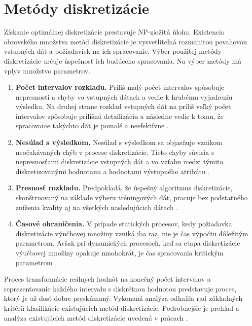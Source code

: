 
\section{Metódy diskretizácie}
Získanie optimálnej diskretizácie prestavuje NP-zložitú úlohu. Existencia obrovského množstva metód diskretizácie je vysvetliteľná rozmanitou povahovou vstupných dát a požiadaviek na ich spracovanie. Výber použitej metódy diskretizácie určuje úspešnosť ich budúceho spracovania. Na výber metódy má vplyv množstvo parametrov.  \cite{levashenkoProj, Chelbus1998}
\begin{enumerate}
	\item \textbf{Počet intervalov rozkladu.}  Príliš malý počet intervalov spôsobuje nepresnosti a chyby vo vstupných dátach a vedie k hrubému vyjadreniu výsledku. Na druhej strane rozklad vstupných dát na príliš veľký počet intervalov spôsobuje prílišnú detailizáciu a následne vedie k tomu, že spracovanie takýchto dát je pomalé a neefektívne  \cite{levashenkoProj, Catlett1991}. %
	\item \textbf{Nesúlad s výsledkom. }  Nesúlad s výsledkom sa objasňuje vznikom neočakávaných chýb v procese diskretizácie. Tieto chyby súvisia s nepresnosťami diskretizácie vstupných dát a vo vzťahu medzi týmito diskretizovanými hodnotami a hodnotami výstupného atribútu \cite{levashenkoProj}. 
	\item \textbf{Presnosť rozkladu.}  Predpokladá, že úspešný algoritmus diskretizácie, skonštruovaný na základe výberu tréningových dát, pracuje bez podstatného zníženia kvality aj na všetkých nasledujúcich dátach \cite{levashenkoProj}. 
	\item \textbf{Časové ohraničenia.}  V prípade statických procesov, kedy požiadavka diskretizácie výučbovej množiny vzniká iba raz, nie je čas výpočtu dôležitým parametrom. Avšak pri dynamických procesoch, keď sa etapa diskretizácie výučbovej množiny opakuje mnohokrát, je čas spracovania kritickým parametrom  \cite{levashenkoProj}.
\end{enumerate}

Proces transformácie reálnych hodnôt na konečný počet intervalov a reprezentovanie každého intervalu s diskrétnou hodnotou predstavuje proces, ktorý je už dosť dobre preskúmaný. Vykonaná analýza odhalila rad základných kritérií klasifikácie existujúcich metód diskretizácie. Podrobnejšie je prehľad a analýza existujúcich metód diskretizácie uvedená v prácach \cite{Lui2002,Garcia2013, Liu2004, Singh2007, Bakar2009, Yang2010, Garcia2010} .

